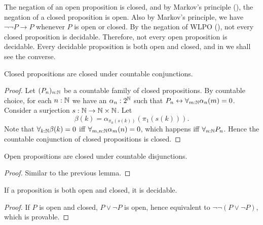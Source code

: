 \begin{remark}\label{rmkOpenClosedNegation}
  The negation of an open proposition is closed, 
  and by Markov's principle (), the negation of a closed proposition is open. 
  Also by Markov's principle, we have $\neg \neg P \to P$ whenever $P$ is open or closed. 
  By the negation of WLPO (), 
  not every closed proposition is decidable. 
  Therefore, not every open proposition is decidable. 
  Every decidable proposition is both open and closed, 
  and in  we shall see the converse. 
\end{remark}
\begin{lemma}\label{ClosedCountableConjunction}
  Closed propositions are closed under countable conjunctions.
\end{lemma}
\begin{proof}
  Let $(P_n)_{n:\mathbb{N}}$ be a countable family of closed propositions. 
  By countable choice, for each 
  $n:\mathbb{N}$ we have an $\alpha_n:2^{\mathbb{N}} $ 
  such that $P_n \leftrightarrow \forall_{m:\mathbb{N}} \alpha_n(m)  =0$. 
  Consider a surjection $s:\mathbb{N} \to \mathbb{N} \times \mathbb{N}$.
  Let 
  $$\beta(k) = \alpha_{\pi_0(s(k))}(\pi_1 (s(k))).$$
  Note that $\forall_{k:\mathbb{N}} \beta(k) = 0$ iff 
  $\forall_{m,n:\mathbb{N}}\alpha_m(n) = 0$, which happens iff $\forall_{n:\mathbb{N}} P_n$. 
  Hence the countable conjunction of closed propositions is closed. 
\end{proof} 
\begin{lemma}\label{OpenCountableDisjunction}
  Open propositions are closed under countable disjunctions. 
\end{lemma}
\begin{proof}
  Similar to the previous lemma. 
\end{proof}
\begin{corollary}\label{ClopenDecidable}
  If a proposition is both open and closed, it is decidable. 
\end{corollary}
\begin{proof}
  If $P$ is open and closed, $P\vee \neg P$ is open, hence
  equivalent to $\neg \neg (P \vee \neg P)$, which is provable. 
\end{proof}

